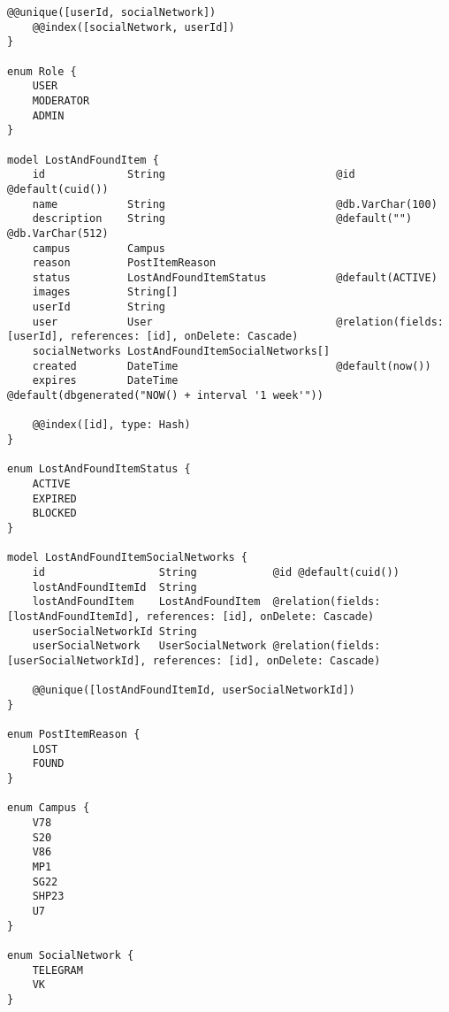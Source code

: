 \documentclass{mirea}
\begin{document}
\begin{lstlisting}[label=lst:factorial]
	@@unique([userId, socialNetwork])
	@@index([socialNetwork, userId])
}

enum Role {
	USER
	MODERATOR
	ADMIN
}

model LostAndFoundItem {
	id             String                           @id @default(cuid())
	name           String                           @db.VarChar(100)
	description    String                           @default("") @db.VarChar(512)
	campus         Campus
	reason         PostItemReason
	status         LostAndFoundItemStatus           @default(ACTIVE)
	images         String[]
	userId         String
	user           User                             @relation(fields: [userId], references: [id], onDelete: Cascade)
	socialNetworks LostAndFoundItemSocialNetworks[]
	created        DateTime                         @default(now())
	expires        DateTime                         @default(dbgenerated("NOW() + interval '1 week'"))
	
	@@index([id], type: Hash)
}

enum LostAndFoundItemStatus {
	ACTIVE
	EXPIRED
	BLOCKED
}

model LostAndFoundItemSocialNetworks {
	id                  String            @id @default(cuid())
	lostAndFoundItemId  String
	lostAndFoundItem    LostAndFoundItem  @relation(fields: [lostAndFoundItemId], references: [id], onDelete: Cascade)
	userSocialNetworkId String
	userSocialNetwork   UserSocialNetwork @relation(fields: [userSocialNetworkId], references: [id], onDelete: Cascade)
	
	@@unique([lostAndFoundItemId, userSocialNetworkId])
}

enum PostItemReason {
	LOST
	FOUND
}

enum Campus {
	V78
	S20
	V86
	MP1
	SG22
	SHP23
	U7
}

enum SocialNetwork {
	TELEGRAM
	VK
}
\end{lstlisting}
	
\end{document}
